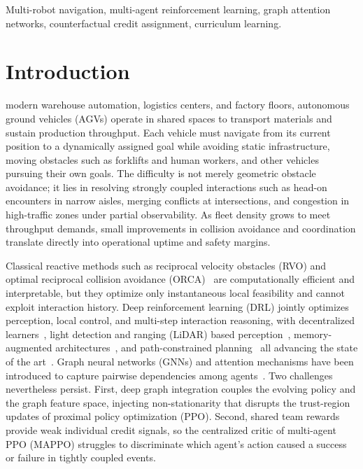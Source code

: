 \documentclass[journal,twoside,web]{ieeecolor}
\begin{document}
\begin{IEEEkeywords}
Multi-robot navigation, multi-agent reinforcement learning, graph attention networks, counterfactual credit assignment, curriculum learning.
\end{IEEEkeywords}

\section{Introduction}
\label{sec:introduction}
 modern warehouse automation, logistics centers, and factory floors, autonomous ground vehicles (AGVs) operate in shared spaces to transport materials and sustain production throughput. Each vehicle must navigate from its current position to a dynamically assigned goal while avoiding static infrastructure, moving obstacles such as forklifts and human workers, and other vehicles pursuing their own goals. The difficulty is not merely geometric obstacle avoidance; it lies in resolving strongly coupled interactions such as head-on encounters in narrow aisles, merging conflicts at intersections, and congestion in high-traffic zones under partial observability. As fleet density grows to meet throughput demands, small improvements in collision avoidance and coordination translate directly into operational uptime and safety margins.

Classical reactive methods such as reciprocal velocity obstacles (RVO) and optimal reciprocal collision avoidance (ORCA)~\cite{vandenberg2008rvo,vandenberg2011orca} are computationally efficient and interpretable, but they optimize only instantaneous local feasibility and cannot exploit interaction history. Deep reinforcement learning (DRL) jointly optimizes perception, local control, and multi-step interaction reasoning, with decentralized learners~\cite{chen2017decentralized,long2018towards,fan2020distributed}, light detection and ranging (LiDAR) based perception~\cite{liu2024saclidar,zhang2025complicated}, memory-augmented architectures~\cite{montero2025memory}, and path-constrained planning~\cite{pico2025pathconstrained,meng2025robust} all advancing the state of the art~\cite{chen2025survey}. Graph neural networks (GNNs) and attention mechanisms have been introduced to capture pairwise dependencies among agents~\cite{zhang2025gatmapf,escudie2024multisoc,bi2025decentralized,liu2025cooperative,xiao2024macns,wong2024mrnppo,wang2025parallelcooperative}. Two challenges nevertheless persist. First, deep graph integration couples the evolving policy and the graph feature space, injecting non-stationarity that disrupts the trust-region updates of proximal policy optimization (PPO). Second, shared team rewards provide weak individual credit signals, so the centralized critic of multi-agent PPO (MAPPO) struggles to discriminate which agent's action caused a success or failure in tightly coupled events.
\end{document}
